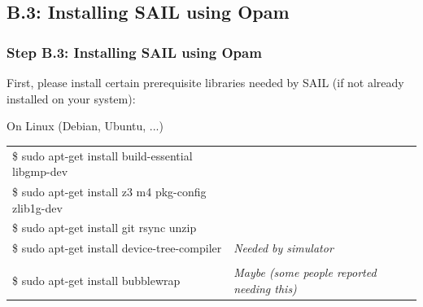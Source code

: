 \documentclass[aspectratio=169]{beamer}
\newcommand{\hm}{\hspace*{1em}}
\newcommand{\scripttt}{\scriptsize\tt}
\begin{document}

\subsection{B.3: Installing SAIL using Opam}

\begin{frame}
  \frametitle{Step B.3: Installing SAIL using Opam}

  First, please install certain prerequisite libraries needed by SAIL (if not already installed on your system):

  \begin{block}{On Linux (Debian, Ubuntu, ...)}
    \scripttt
    \begin{tabular}{ll}
      \$ sudo apt-get install build-essential libgmp-dev \\
      \$ sudo apt-get install z3 m4 pkg-config zlib1g-dev \\
      \$ sudo apt-get install git  rsync  unzip \\
      \$ sudo apt-get install device-tree-compiler \hm & {\it Needed by simulator} \\
      \\
      \$ sudo apt-get install bubblewrap \hm & {\it Maybe (some people reported needing this)}
    \end{tabular}
  \end{block}

\end{frame}

\end{document}
